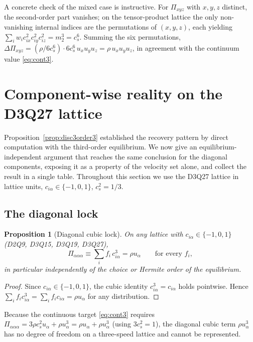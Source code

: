 \documentclass[preprint,11pt]{elsarticle}
\newtheorem{proposition}{Proposition}
\newcommand{\cs}{c_s}
\newcommand{\sumi}{\sum_i}
\begin{document}
A concrete check of the mixed case is instructive. For $\Pi_{xyz}$ with
$x,y,z$ distinct, the second-order part vanishes; on the tensor-product lattice
the only non-vanishing internal indices are the permutations of $(x,y,z)$, each
yielding $\sumi w_i c_{ix}^{2}c_{iy}^{2}c_{iz}^{2}=m_2^{3}=\cs^{6}$. Summing the
six permutations,
$\Delta\Pi_{xyz}=(\rho/6\cs^{6})\cdot 6\cs^{6}\,u_xu_yu_z=\rho\,u_xu_yu_z$, in
agreement with the continuum value \eqref{eq:cont3}.

\section{Component-wise reality on the D3Q27 lattice}
\label{sec:d3q27}

Proposition~\ref{prop:disc3order3} established the recovery pattern by direct
computation with the third-order equilibrium. We now give an
equilibrium-independent argument that reaches the same conclusion for the
diagonal components, exposing it as a property of the velocity set alone, and
collect the result in a single table. Throughout this section we use the D3Q27
lattice in lattice units, $c_{i\alpha}\in\{-1,0,1\}$, $\cs^{2}=1/3$.

\subsection{The diagonal lock}

\begin{proposition}[Diagonal cubic lock]
\label{prop:lock}
On any lattice with $c_{i\alpha}\in\{-1,0,1\}$ (D2Q9, D3Q15, D3Q19, D3Q27),
\begin{equation}
\Pi_{\alpha\alpha\alpha}\equiv\sum_i f_i\,c_{i\alpha}^{3}=\rho u_\alpha
\qquad\text{for every }f_i,
\label{eq:lock}
\end{equation}
in particular independently of the choice or Hermite order of the
equilibrium.
\end{proposition}

\begin{proof}
Since $c_{i\alpha}\in\{-1,0,1\}$, the cubic identity $c_{i\alpha}^{3}
=c_{i\alpha}$ holds pointwise. Hence
$\sum_i f_i c_{i\alpha}^{3}=\sum_i f_i c_{i\alpha}=\rho u_\alpha$ for any
distribution.
\end{proof}

Because the continuous target \eqref{eq:cont3} requires
$\Pi_{\alpha\alpha\alpha}=3\rho\cs^{2}u_\alpha+\rho u_\alpha^{3}
=\rho u_\alpha+\rho u_\alpha^{3}$ (using $3\cs^{2}=1$), the diagonal cubic
term $\rho u_\alpha^{3}$ has no degree of freedom on a three-speed lattice and
cannot be represented.
\end{document}
